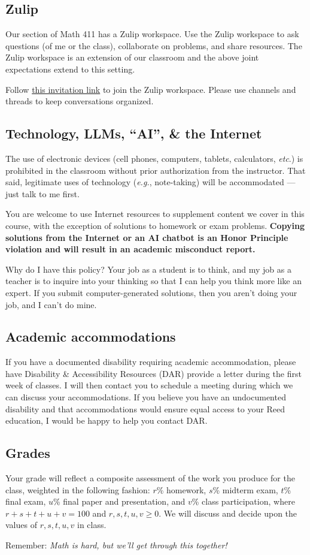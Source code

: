 \documentclass[11pt,twoside]{amsart}
\begin{document}
\subsection*{Zulip}
Our section of Math 411 has a Zulip workspace.  Use the Zulip workspace to ask questions (of me or the class), collaborate on problems, and share resources. The Zulip workspace is an extension of our classroom and the above joint expectations extend to this setting.

Follow \href{https://math411-2025.zulipchat.com/join/6tyxsz2asnf5zum6bfblf2qu/}{this invitation link} to join the Zulip workspace. Please use channels and threads to keep conversations organized.

\subsection*{Technology, LLMs, ``AI'', \& the Internet}
The use of electronic devices (cell phones, computers, tablets, 
calculators, \emph{etc}.) is prohibited in the classroom without prior authorization from the instructor.  That said, legitimate uses 
of technology (\emph{e.g.}, note-taking) will be accommodated --- 
just talk to me first.

You are welcome to use Internet resources to supplement content we cover in this course, with the exception of solutions to homework or exam problems.  \textbf{Copying solutions from the Internet or an AI chatbot is an Honor Principle violation and will result in an academic misconduct report.}

Why do I have this policy? Your job as a student is to think, and my job as a teacher is to inquire into your thinking so that I can help you think more like an expert. If you submit computer-generated solutions, then you aren't doing your job, and I can't do mine.

\subsection*{Academic accommodations}
If you have a documented disability requiring academic accommodation, please have  Disability \& Accessibility Resources (DAR)  provide a letter during the first week of classes.  I will then contact you to schedule a meeting during which we can discuss your accommodations.  If you believe you have an undocumented disability and that accommodations would ensure equal access to your Reed education, I would be happy to help you contact DAR.

\subsection*{Grades}
Your grade will reflect a composite assessment of the work you produce for the class, weighted in the following fashion:  $r$\% homework, $s$\% midterm exam, $t$\% final exam, $u$\% final paper and presentation, and $v$\% class participation, where $r+s+t+u+v = 100$ and $r,s,t,u,v\ge 0$. We will discuss and decide upon the values of $r,s,t,u,v$ in class.

\bigskip \bigskip

\begin{center}
Remember: \emph{Math is hard, but we'll get through this together!}
\end{center}
\end{document}
